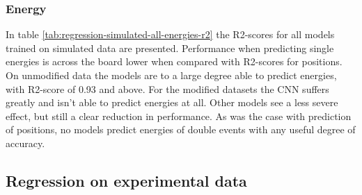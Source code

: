 \subsubsection{Energy}
In table \ref{tab:regression-simulated-all-energies-r2} the R2-scores for all models
trained on simulated data are presented.
Performance when predicting single energies is across the board lower when compared with
R2-scores for positions. On unmodified data the models are to a large degree able to
predict energies, with R2-score of 0.93 and above. For the modified datasets the CNN
suffers greatly and isn't able to predict energies at all. Other models see a less
severe effect, but still a clear reduction in performance.
As was the case with prediction of positions, no models predict energies
of double events with any useful degree of accuracy.


\subsection{Regression on experimental data}

